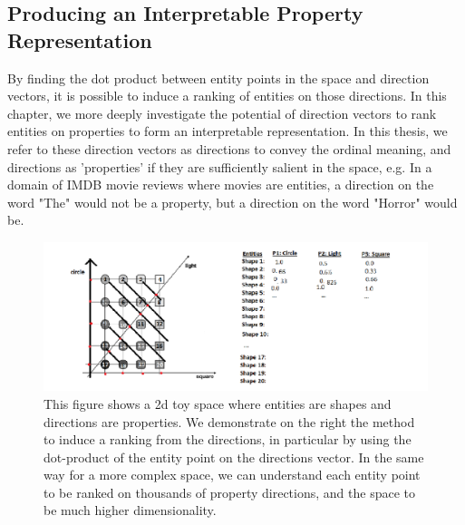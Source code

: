 \subsection{Producing an Interpretable Property Representation}

By finding the dot product between entity points in the space and direction vectors, it is possible to induce a ranking of entities on those directions. In this chapter, we more deeply investigate the potential of direction vectors to rank entities on properties to form an interpretable representation.  In this thesis, we refer to these direction vectors as directions to convey the ordinal meaning, and directions as 'properties' if they are sufficiently salient in the space, e.g. In a domain of IMDB movie reviews where movies are entities, a direction on the word "The" would not be a property, but a direction on the word "Horror" would be. 

\begin{figure}[t]
	\includegraphics[width=\textwidth]{images/toydirections.png}
	\centering
	\caption{This figure shows a 2d toy space where entities are shapes and directions are properties. We demonstrate on the right the method to induce a ranking from the directions, in particular by using the dot-product of the entity point on the directions vector. In the same way for a more complex space, we can understand each entity point to be ranked on thousands of property directions, and the space to be much higher dimensionality.}\label{ToyDirection}
\end{figure}



